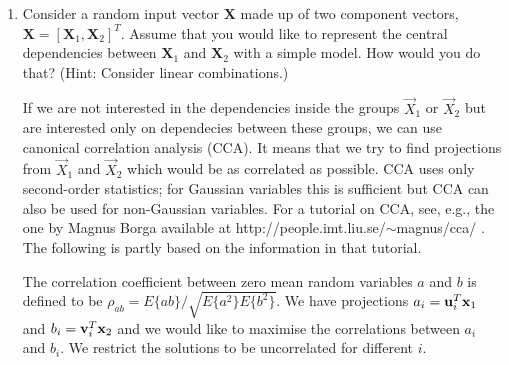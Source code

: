 \begin{enumerate}

\item Consider a random input vector $\mathbf{X}$ made up of two component vectors,
  $\mathbf{X} = [\mathbf{X}_1,\mathbf{X}_2]^T$. Assume that you would like to represent the
  central dependencies between $\mathbf{X}_1$ and $\mathbf{X}_2$ with a  simple
  model. How would you do that? (Hint: Consider linear combinations.)

  \begin{solution}

    If we are not interested in the dependencies inside the groups
    $\vec{X}_1$ or $\vec{X}_2$ but are interested only on dependecies
    between these groups, we can use canonical correlation analysis
    (CCA).  It means that we try to find projections from $\vec{X}_1$
    and $\vec{X}_2$ which would be as correlated as possible. CCA uses
    only second-order statistics; for Gaussian variables this is
    sufficient but CCA can also be used for non-Gaussian
    variables. For a tutorial on CCA, see, e.g., the one by Magnus
    Borga available at http://people.imt.liu.se/$\sim$magnus/cca/
    . The following is partly based on the information in that
    tutorial.

    The correlation coefficient between zero mean random variables $a$
    and $b$ is defined to be $\rho_{ab} =
    E\{ab\}/\sqrt{E\{a^2\}E\{b^2\}}$.  We have projections $a_i =
    \mathbf{u}_i^T \mathbf{x}_1$ and $b_i = \mathbf{v}_i^T \mathbf{x}_2$ and we would like to maximise
    the correlations between $a_i$ and $b_i$. We restrict the
    solutions to be uncorrelated for different $i$.
    


\end{solution}
\end{enumerate}
